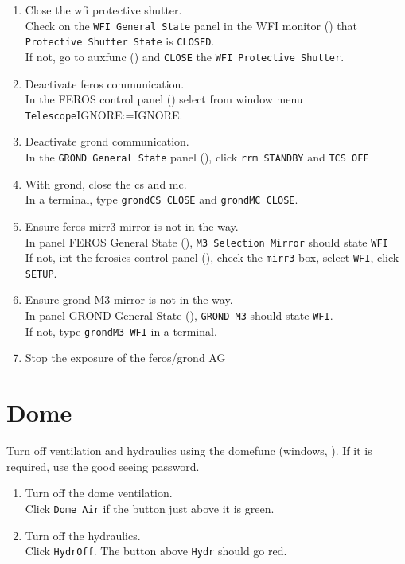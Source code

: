 \documentclass[11pt,fleqn,a4paper]{book}
\makeatletter
\def\menu#1#2{\texttt{#1}\ifx{}#2\else\@for\@x:=#2\do{$\rightarrow$\texttt{\@x}}\fi}
\def\wmenu#1#2{window menu \menu{#1}{#2}}
\makeatother
\begin{document}
\begin{enumerate}
\item Close the \gls{wfi} \gls{protective shutter}.\\
      Check on the \texttt{WFI \gls{General State}} panel in the WFI monitor () that \texttt{Protective Shutter State} is \texttt{CLOSED}.\\
      If not, go to \gls{auxfunc} () and \texttt{CLOSE} the \texttt{WFI Protective Shutter}.
\item Deactivate \gls{feros} communication.\\ 
      In the FEROS control panel () select from \wmenu{Telescope}{IGNORE}.
\item Deactivate \gls{grond} communication.\\ 
      In the \texttt{GROND \gls{General State}} panel (), click \texttt{\gls{rrm} STANDBY} and \texttt{TCS OFF}
\item With \gls{grond}, close the \gls{cs} and \gls{mc}.\\ 
      In a terminal, type \texttt{\gls{grondCS} CLOSE} and \texttt{\gls{grondMC} CLOSE}.
\item Ensure \gls{feros} \gls{mirr3} mirror is not in the way.\\
      In panel FEROS \gls{General State} (), \texttt{\gls{M3} Selection Mirror} should state \texttt{WFI}\\
      If not, int the \gls{ferosics} control panel (), check the \texttt{\gls{mirr3}} box, select \texttt{WFI}, click \texttt{SETUP}.
\item Ensure \gls{grond} \gls{M3} mirror is not in the way.\\
      In panel  GROND \gls{General State} (), \texttt{GROND \gls{M3}} should state \texttt{WFI}.\\
      If not, type \texttt{\gls{grondM3} WFI} in a terminal.
\item Stop the exposure of the \gls{feros}/\gls{grond} AG 
\end{enumerate}


\section{Dome}

Turn off ventilation and hydraulics using the \gls{domefunc} (\gls{windows}, ). If it is required, use the good seeing password.
\begin{enumerate}
  \item Turn off the dome ventilation.\\
        Click \texttt{Dome Air} if the button just above it is green.
  \item Turn off the hydraulics.\\
        Click \texttt{HydrOff}. The button above \texttt{Hydr} should go red. 
\end{enumerate}
\end{document}
